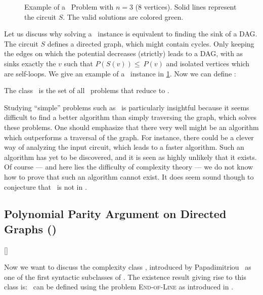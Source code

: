 
\begin{figure}
	\centering
	\caption[Example of a \Localopt\ Problem]{Example of a \Localopt\ Problem with $n=3$ (8 vertices). Solid lines represent the circuit $S$. The valid solutions are colored green.}
	\label{fig:localopt_example}
\end{figure}

Let us discuss why solving a \Localopt\ instance is equivalent to finding the sink of a DAG. The circuit $S$ defines a directed graph, which might contain cycles. Only keeping the edges on which the potential decreases (strictly) leads to a DAG, with as sinks exactly the $v$ such that $P(S(v)) \leq\ P(v)$ and isolated vertices which are self-loops. We give an example of a \Localopt\ instance in \cref{fig:localopt_example}. Now we can define \PLS:

\begin{definition}
	The class \PLS\ is the set of all \TFNP\ problems that reduce to \Localopt.
\end{definition}

Studying ``simple'' problems such as \Localopt\ is particularly insightful because it seems difficult to find a better algorithm than simply traversing the graph, which solves these problems. One should emphasize that there very well might be an algorithm which outperforms a traversal of the graph. For instance, there could be a clever way of analyzing the input circuit, which leads to a faster algorithm. Such an algorithm has yet to be discovered, and it is seen as highly unlikely that it exists. Of course --- and here lies the difficulty of complexity theory --- we do not know how to prove that such an algorithm cannot exist. It does seem sound though to conjecture that \PLS\ is not in \FP.

\subsection{Polynomial Parity Argument on Directed Graphs (\PPAD)}[\PPAD]

Now we want to discuss the complexity class \PPAD, introduced by Papadimitriou~ as one of the first syntactic subclasses of \TFNP. The existence result giving rise to this class is: 
\PPAD\ can be defined using the problem \textsc{End-of-Line} as introduced in .

